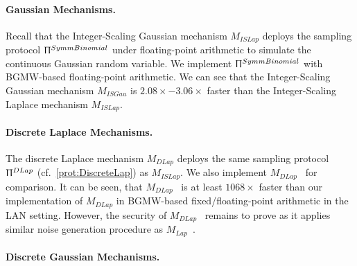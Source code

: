 
\paragraph{Gaussian Mechanisms.}
Recall that the Integer-Scaling Gaussian mechanism $M_{ISLap}$ deploys the sampling protocol $\Uppi^{SymmBinomial}$ under floating-point arithmetic to simulate the continuous Gaussian random variable.
We implement $\Uppi^{SymmBinomial}$ with BGMW-based floating-point arithmetic.
We can see that the Integer-Scaling Gaussian mechanism $M_{ISGau}$ is $2.08\times-3.06\times$ faster than the Integer-Scaling Laplace mechanism $M_{ISLap}$.

\paragraph{Discrete Laplace Mechanisms.}
The discrete Laplace mechanism $M_{DLap}$ deploys the same sampling protocol $\Uppi^{DLap}$ (cf.~\autoref{prot:DiscreteLap}) as $M_{ISLap}$.
We also implement $M_{DLap}$~\cite{eigner2014differentially} for comparison.
It can be seen, that $M_{DLap}$~\cite{eigner2014differentially} is at least $1068\times$ faster than our implementation of $M_{DLap}$ in BGMW-based fixed/floating-point arithmetic in the LAN setting. However, the security of $M_{DLap}$~\cite{eigner2014differentially} remains to prove as it applies similar noise generation procedure as $M_{Lap}$~\cite{eigner2014differentially}.

\paragraph{Discrete Gaussian Mechanisms.}

